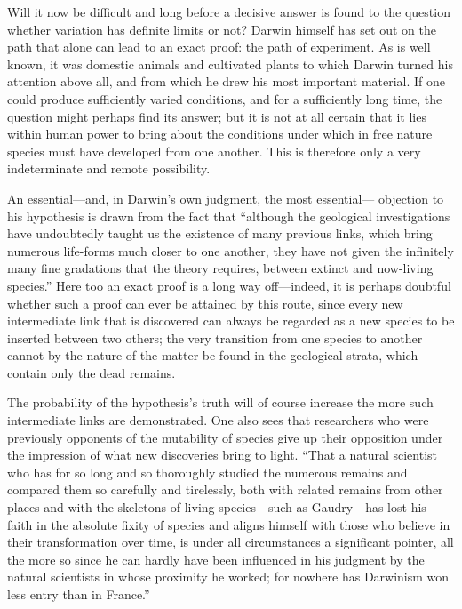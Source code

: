 \documentclass[12pt,a4paper]{article}
\begin{document}
Will it now be difficult and long before a decisive answer is found to
the question whether variation has definite limits or not? Darwin
himself has set out on the path that alone can lead to an exact proof:
the path of experiment. As is well known, it was domestic animals and
cultivated plants to which Darwin turned his attention above all, and
from which he drew his most important material. If one could produce
sufficiently varied conditions, and for a sufficiently long time, the
question might perhaps find its answer; but it is not at all certain
that it lies within human power to bring about the conditions under
which in free nature species must have developed from one another.
This is therefore only a very indeterminate and remote possibility.

An essential---and, in Darwin's own judgment, the most essential---
objection to his hypothesis is drawn from the fact that ``although the
geological investigations have undoubtedly taught us the existence of
many previous links, which bring numerous life-forms much closer to
one another, they have not given the infinitely many fine gradations
that the theory requires, between extinct and now-living species.''
Here too an exact proof is a long way off---indeed, it is perhaps
doubtful whether such a proof can ever be attained by this route,
since every new intermediate link that is discovered can always be
regarded as a new species to be inserted between two others; the very
transition from one species to another cannot by the nature of the
matter be found in the geological strata, which contain only the dead
remains.

The probability of the hypothesis's truth will of course increase the
more such intermediate links are demonstrated. One also sees that
researchers who were previously opponents of the mutability of species
give up their opposition under the impression of what new discoveries
bring to light. ``That a natural scientist who has for so long and so
thoroughly studied the numerous remains and compared them so carefully
and tirelessly, both with related remains from other places and with
the skeletons of living species---such as Gaudry---has lost his faith
in the absolute fixity of species and aligns himself with those who
believe in their transformation over time, is under all circumstances
a significant pointer, all the more so since he can hardly have been
influenced in his judgment by the natural scientists in whose
proximity he worked; for nowhere has Darwinism won less entry than in
France.''
\end{document}
